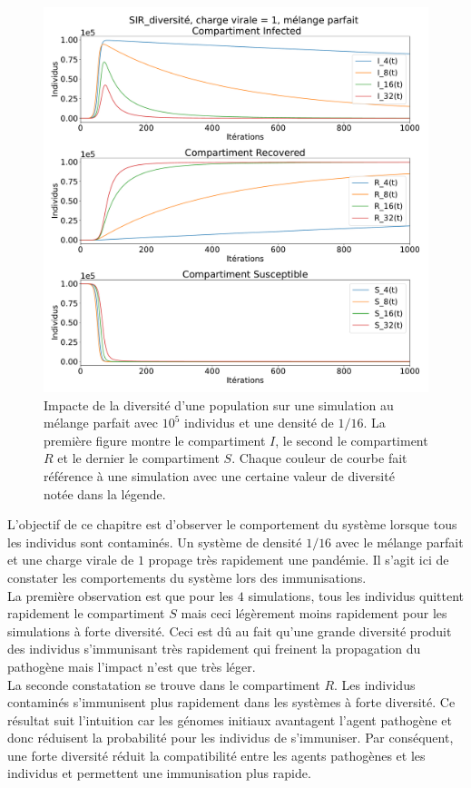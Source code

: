 \newpage

\begin{figure}[h]
	\centering
	\captionsetup{justification=centering}
	\includegraphics[width=.8\textwidth]{Images/SIR_diversite_mix.pdf}
	\caption[Impacte de la diversité]{Impacte de la diversité d'une population sur une simulation au mélange parfait avec $10^5$ individus et une densité de $1/16$. La première figure montre le compartiment $I$, le second le compartiment $R$ et le dernier le compartiment $S$. Chaque couleur de courbe fait référence à une simulation avec une certaine valeur de diversité notée dans la légende.}
\end{figure}

L'objectif de ce chapitre est d'observer le comportement du système lorsque tous les individus sont contaminés. Un système de densité $1/16$ avec le mélange parfait et une charge virale de $1$ propage très rapidement une pandémie. Il s'agit ici de constater les comportements du système lors des immunisations.\\

La première observation est que pour les $4$ simulations, tous les individus quittent rapidement le compartiment $S$ mais ceci légèrement moins rapidement pour les simulations à forte diversité. Ceci est dû au fait qu'une grande diversité produit des individus s'immunisant très rapidement qui freinent la propagation du pathogène mais l'impact n'est que très léger.\\

La seconde constatation se trouve dans le compartiment $R$. Les individus contaminés s'immunisent plus rapidement dans les systèmes à forte diversité. Ce résultat suit l'intuition car les génomes initiaux avantagent l'agent pathogène et donc réduisent la probabilité pour les individus de s'immuniser. Par conséquent, une forte diversité réduit la compatibilité entre les agents pathogènes et les individus et permettent une immunisation plus rapide.

